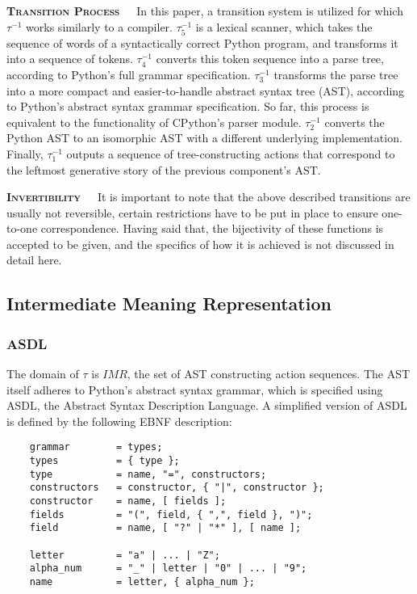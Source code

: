 \documentclass[12pt]{article}
\begin{document}
\textbf{\textsc{Transition Process}}\ \ \ In this paper, a transition system is utilized for which $\tau^{-1}$ works similarly to a compiler. $\tau_{5}^{-1}$ is a lexical scanner, which takes the sequence of words of a syntactically correct Python program, and transforms it into a sequence of tokens. $\tau_{4}^{-1}$ converts this token sequence into a parse tree, according to Python's full grammar specification. $\tau_{3}^{-1}$ transforms the parse tree into a more compact and easier-to-handle abstract syntax tree (AST), according to Python's abstract syntax grammar specification. So far, this process is equivalent to the functionality of CPython's parser module. $\tau_{2}^{-1}$ converts the Python AST to an isomorphic AST with a different underlying implementation. Finally, $\tau_{1}^{-1}$ outputs a sequence of tree-constructing actions that correspond to the leftmost generative story of the previous component's AST.

\textbf{\textsc{Invertibility}}\ \ \ It is important to note that the above described transitions are usually not reversible, certain restrictions have to be put in place to ensure one-to-one correspondence. Having said that, the bijectivity of these functions is accepted to be given, and the specifics of how it is achieved is not discussed in detail here.

\subsection{Intermediate Meaning Representation}

\subsubsection{ASDL}

The domain of $\tau$ is $IMR$, the set of AST constructing action sequences. The AST itself adheres to Python's abstract syntax grammar, which is specified using ASDL, the Abstract Syntax Description Language. A simplified version of ASDL is defined by the following EBNF description:

\begin{verbatim}
    grammar        = types;
    types          = { type };
    type           = name, "=", constructors;
    constructors   = constructor, { "|", constructor };
    constructor    = name, [ fields ];
    fields         = "(", field, { ",", field }, ")";
    field          = name, [ "?" | "*" ], [ name ];

    letter         = "a" | ... | "Z";
    alpha_num      = "_" | letter | "0" | ... | "9";
    name           = letter, { alpha_num };
\end{verbatim}
\end{document}

